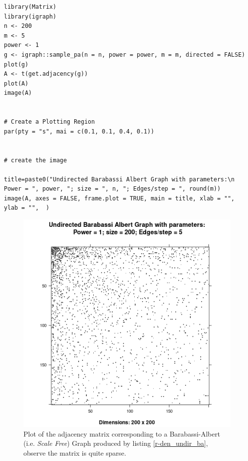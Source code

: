 \documentclass[11pt]{article}
\begin{document}
\begin{listing}[htbp]
\begin{verbatim}
library(Matrix)
library(igraph)
n <- 200
m <- 5
power <- 1
g <- igraph::sample_pa(n = n, power = power, m = m, directed = FALSE)
plot(g)
A <- t(get.adjacency(g))
plot(A)
image(A)


# Create a Plotting Region
par(pty = "s", mai = c(0.1, 0.1, 0.4, 0.1))


# create the image

title=paste0("Undirected Barabassi Albert Graph with parameters:\n Power = ", power, "; size = ", n, "; Edges/step = ", round(m))
image(A, axes = FALSE, frame.plot = TRUE, main = title, xlab = "", ylab = "",  )
\end{verbatim}
\caption{\label{r-den_undir_ba}\textbf{\emph{R}} code to produce an image illustrating the density of a simulated Barabasi-Albert graph, the \emph{Barabasi-Albert} graph is a good analouge for the link structure of the internet \cite{langvilleGooglePageRankScience2012,barabasiPhysicsWeb2001,barabasiScalefreeCharacteristicsRandom2000} see the output in figure \ref{fig:den_undir_ba}}
\end{listing}

\begin{figure}[htbp]
\centering
\includegraphics[width=12cm]{media/DensityUndirectedBA.png}
\caption{\label{fig:den_undir_ba}Plot of the adjacency matrix corresponding to a Barabassi-Albert (i.e. \emph{Scale Free}) Graph produced by listing \ref{r-den_undir_ba}, observe the matrix is quite sparse.}
\end{figure}
\end{document}
